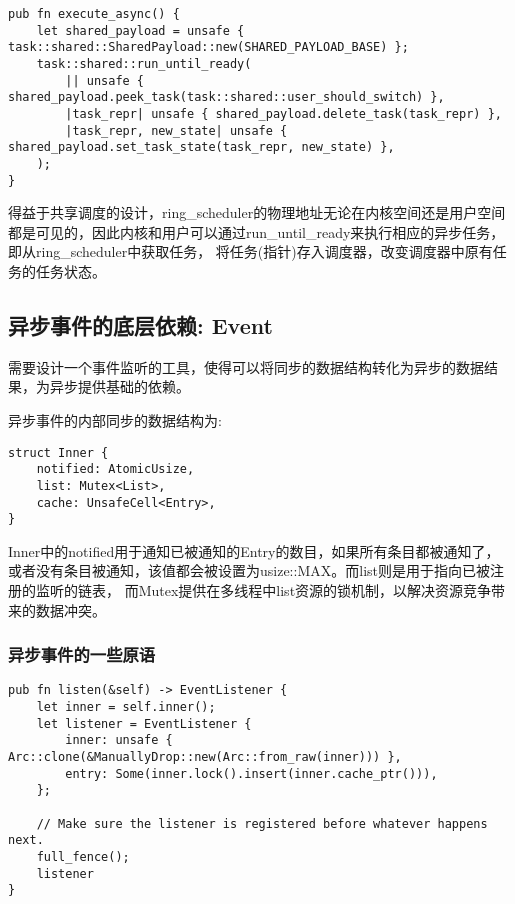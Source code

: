 \begin{lstlisting}[caption=用户空间的异步逻辑]
pub fn execute_async() {
    let shared_payload = unsafe { task::shared::SharedPayload::new(SHARED_PAYLOAD_BASE) };
    task::shared::run_until_ready(
        || unsafe { shared_payload.peek_task(task::shared::user_should_switch) },
        |task_repr| unsafe { shared_payload.delete_task(task_repr) },
        |task_repr, new_state| unsafe { shared_payload.set_task_state(task_repr, new_state) },
    );
}
\end{lstlisting}

得益于共享调度的设计，ring\_scheduler的物理地址无论在内核空间还是用户空间都是可见的，因此内核和用户可以通过run\_until\_ready来执行相应的异步任务， 即从ring\_scheduler中获取任务， 将任务(指针)存入调度器，改变调度器中原有任务的任务状态。


\subsection{异步事件的底层依赖: Event}

需要设计一个事件监听的工具，使得可以将同步的数据结构转化为异步的数据结果，为异步提供基础的依赖。

异步事件的内部同步的数据结构为:

\begin{lstlisting}[caption=异步事件底层的同步结构]
struct Inner {
    notified: AtomicUsize,
    list: Mutex<List>,
    cache: UnsafeCell<Entry>,
}
\end{lstlisting}

Inner中的notified用于通知已被通知的Entry的数目，如果所有条目都被通知了，或者没有条目被通知，该值都会被设置为usize::MAX。而list则是用于指向已被注册的监听的链表， 而Mutex提供在多线程中list资源的锁机制，以解决资源竞争带来的数据冲突。

\subsubsection{异步事件的一些原语}
\label{sssec:event}

\begin{lstlisting}[caption = 监听者的注册]
pub fn listen(&self) -> EventListener {
    let inner = self.inner();
    let listener = EventListener {
        inner: unsafe { Arc::clone(&ManuallyDrop::new(Arc::from_raw(inner))) },
        entry: Some(inner.lock().insert(inner.cache_ptr())),
    };

    // Make sure the listener is registered before whatever happens next.
    full_fence();
    listener
}
\end{lstlisting}

